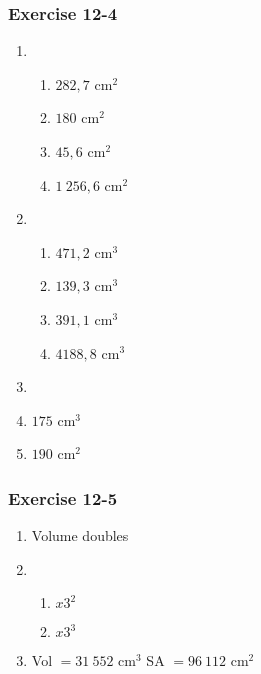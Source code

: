 \subsubsection*{Exercise 12-4} %
\begin{enumerate}[noitemsep, label=\textbf{\arabic*}. ] 
\item %
\begin{enumerate}[noitemsep, label=\textbf{\alph*}. ]
 \item $282,7$ cm$^2$
\item $180$ cm$^2$
\item  $45,6$ cm$^2$
\item $1~256,6$ cm$^2$
\end{enumerate}
\item %
\begin{enumerate}[noitemsep, label=\textbf{\alph*}. ]
 \item $471,2$ cm$^3$
\item $139,3$ cm$^3$
\item  $391,1$ cm$^3$
\item $4188,8$ cm$^3$
\end{enumerate}
\item %
\item $175$ cm$^3$
\item $190$ cm$^2$

\end{enumerate}
\subsubsection*{Exercise 12-5} %
\begin{enumerate}[noitemsep, label=\textbf{\arabic*}. ] 
 \item Volume doubles%
\item %
\begin{enumerate}[noitemsep, label=\textbf{(\alph*)} ] 
\item $x3^2$%
\item $x3^3$%
\end{enumerate}
\item Vol $=31~ 552$ cm$^3$ SA $=96~ 112$ cm$^2$ %
\end{enumerate}
% 

